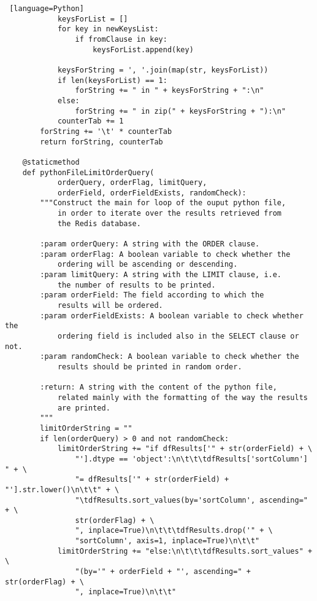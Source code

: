 \documentclass[11pt]{article}
\begin{document}
\begin{lstlisting} [language=Python]
            keysForList = []
            for key in newKeysList:
                if fromClause in key:
                    keysForList.append(key)

            keysForString = ', '.join(map(str, keysForList))
            if len(keysForList) == 1:
                forString += " in " + keysForString + ":\n"
            else:
                forString += " in zip(" + keysForString + "):\n"
            counterTab += 1
        forString += '\t' * counterTab
        return forString, counterTab

    @staticmethod
    def pythonFileLimitOrderQuery(
            orderQuery, orderFlag, limitQuery,
            orderField, orderFieldExists, randomCheck):
        """Construct the main for loop of the ouput python file,
            in order to iterate over the results retrieved from
            the Redis database.

        :param orderQuery: A string with the ORDER clause.
        :param orderFlag: A boolean variable to check whether the
            ordering will be ascending or descending.
        :param limitQuery: A string with the LIMIT clause, i.e.
            the number of results to be printed.
        :param orderField: The field according to which the
            results will be ordered.
        :param orderFieldExists: A boolean variable to check whether the
            ordering field is included also in the SELECT clause or not.
        :param randomCheck: A boolean variable to check whether the
            results should be printed in random order.

        :return: A string with the content of the python file,
            related mainly with the formatting of the way the results
            are printed.
        """
        limitOrderString = ""
        if len(orderQuery) > 0 and not randomCheck:
            limitOrderString += "if dfResults['" + str(orderField) + \
                "'].dtype == 'object':\n\t\t\tdfResults['sortColumn'] " + \
                "= dfResults['" + str(orderField) + "'].str.lower()\n\t\t" + \
                "\tdfResults.sort_values(by='sortColumn', ascending=" + \
                str(orderFlag) + \
                ", inplace=True)\n\t\t\tdfResults.drop('" + \
                "sortColumn', axis=1, inplace=True)\n\t\t"
            limitOrderString += "else:\n\t\t\tdfResults.sort_values" + \
                "(by='" + orderField + "', ascending=" + str(orderFlag) + \
                ", inplace=True)\n\t\t"


\end{lstlisting}
\end{document}
